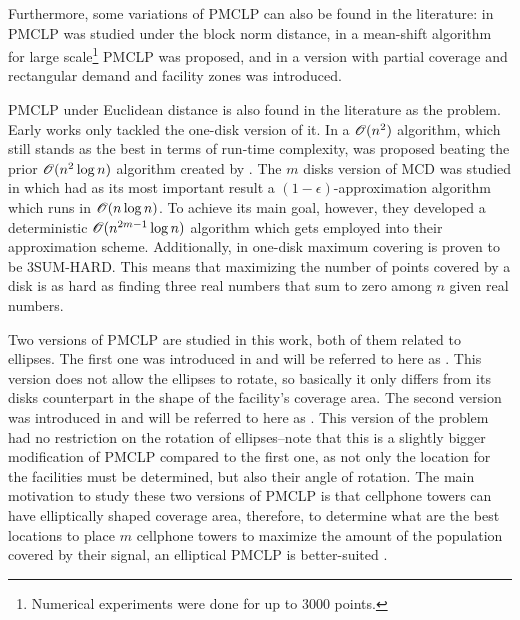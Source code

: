 Furthermore, some variations of PMCLP can also be found in the literature: in  PMCLP was studied under the block norm distance, in  a mean-shift algorithm for large scale\footnote{Numerical experiments were done for up to $3000$ points.} PMCLP was proposed, and in  a version with partial coverage and rectangular demand and facility zones was introduced.

PMCLP under Euclidean distance is also found in the literature as the  problem.
Early works only tackled the one-disk version of it. In  a $\mathscr{O}(n^2)$ algorithm, which still stands as the best in terms of run-time complexity, was proposed beating the prior $\mathscr{O}(n^2\log{n})$ algorithm created by .
The $m$ disks version of MCD was studied in  which had as its most important result a $(1-\epsilon)$-approximation algorithm which runs in $\mathscr{O}(n\log{n})$. To achieve its main goal, however, they developed a deterministic $\mathscr{O}(n^{2m-1}\log{n})$ algorithm which gets employed into their approximation scheme.
Additionally, in  one-disk maximum covering is proven to be 3SUM-HARD. This means that maximizing the number of points covered by a disk is as hard as finding three real numbers that sum to zero among $n$ given real numbers.

Two versions of PMCLP are studied in this work, both of them related to ellipses. The first one was introduced in  and will be referred to here as . This version does not allow the ellipses to rotate, so basically it only differs from its disks counterpart in the shape of the facility's coverage area. The second version was introduced in  and will be referred to here as . This version of the problem had no restriction on the rotation of ellipses--note that this is a slightly bigger modification of PMCLP compared to the first one, as not only the location for the facilities must be determined, but also their angle of rotation.
The main motivation to study these two versions of PMCLP is that cellphone towers can have elliptically shaped coverage area, therefore, to determine what are the best locations to place $m$ cellphone towers to maximize the amount of the population covered by their signal, an elliptical PMCLP is better-suited \cite{canbolat}.

